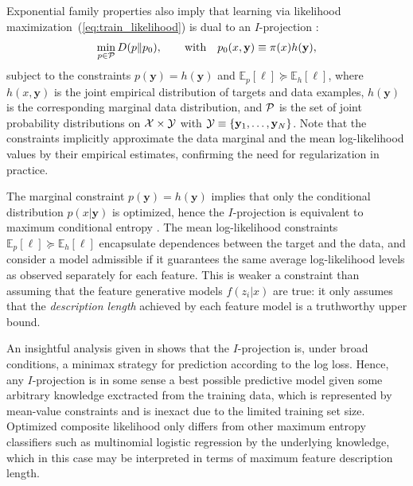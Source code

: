 \documentclass[english]{scrartcl}
\def\y{{\mathbf{y}}}
\newcommand{\bell}{{\boldsymbol{\ell}}}
\newcommand{\E}{\mathbb{E}}
\begin{document}
Exponential family properties also imply that learning via likelihood maximization~(\ref{eq:train_likelihood}) is dual to an $I$-projection \cite{Csiszar-84}: 
\begin{equation}
\label{eq:maxent}
\min_{p\in{\cal P}} D(p\|p_0),
\qquad \text{with} \quad
p_0(x,\y) \equiv \pi(x)h(\y),
\end{equation}
subject to the constraints $p(\y)=h(\y)$ and $\E_p[\bell] \succeq \E_h[\bell]$, where $h(x,\y)$ is the joint empirical distribution of targets and data examples, $h(\y)$ is the corresponding marginal data distribution, and ${\cal P}$ is the set of joint probability distributions on ${\cal X}\times {\cal Y}$ with ${\cal Y}\equiv\{\y_1,\ldots,\y_N\}$. Note that the constraints implicitly approximate the data marginal and the mean log-likelihood values by their empirical estimates, confirming the need for regularization in practice.

The marginal constraint $p(\y)=h(\y)$ implies that only the conditional distribution $p(x|\y)$ is optimized, hence the $I$-projection is equivalent to maximum conditional entropy \cite{BergerA-96}. The mean log-likelihood constraints $\E_p[\bell] \succeq \E_h[\bell]$ encapsulate dependences between the target and the data, and consider a model admissible if it guarantees the same average log-likelihood levels as observed separately for each feature. This is weaker a constraint than assuming that the feature generative models $f(z_i|x)$ are true: it only assumes that the {\em description length} \cite{Grunwald-07} achieved by each feature model is a truthworthy upper bound.


An insightful analysis given in \cite{Grunwald-04} shows that the $I$-projection is, under broad conditions, a minimax strategy for prediction according to the log loss. Hence, any $I$-projection is in some sense a best possible predictive model given some arbitrary knowledge exctracted from the training data, which is represented by mean-value constraints and is inexact due to the limited training set size. Optimized composite likelihood only differs from other maximum entropy classifiers such as multinomial logistic regression by the underlying knowledge, which in this case may be interpreted in terms of maximum feature description length.
\end{document}
